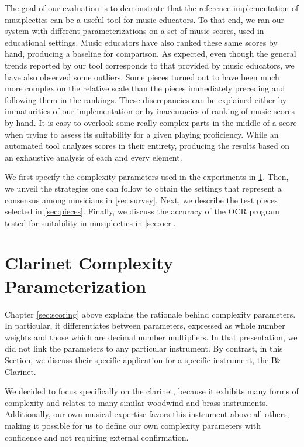 \documentclass[12pt]{report}
\begin{document}
The goal of our evaluation is to demonstrate that the reference implementation of musiplectics can be a useful tool for music educators. To that end, we ran our system with different parameterizations on a set of music scores, used in educational settings. Music educators have also ranked these same scores by hand, producing a baseline for comparison. As expected, even though the general trends reported by our tool corresponds to that provided by music educators, we have also observed some outliers. Some pieces turned out to have been much more complex on the relative scale than the pieces immediately preceding and following them in the rankings. These discrepancies can be explained either by immaturities of our implementation or by inaccuracies of ranking of music scores by hand. It is easy to overlook some really complex parts in the middle of a score when trying to assess its suitability for a given playing proficiency. While an automated tool analyzes scores in their entirety, producing the results based on an exhaustive analysis of each and every element.

We first specify the complexity parameters used in the experiments in \ref{sec:settings}. Then, we unveil the strategies one can follow to obtain the settings that represent a consensus among musicians in \ref{sec:survey}. Next, we describe the test pieces selected in \ref{sec:pieces}. Finally, we discuss the accuracy of the OCR program tested for suitability in musiplectics in \ref{sec:ocr}.


\section{Clarinet Complexity Parameterization} 
\label{sec:settings}

Chapter \ref{sec:scoring} above explains the rationale behind complexity parameters. In particular, it differentiates between parameters, expressed as whole number weights and those which are decimal number multipliers. In that presentation, we did not link the parameters to any particular instrument. By contrast, in this Section, we discuss their specific application for a specific instrument, the B$\flat$ Clarinet.

We decided to focus specifically on the clarinet, because it exhibits many forms of complexity and relates to many similar woodwind and brass instruments. Additionally, our own musical expertise favors this instrument above all others, making it possible for us to define our own complexity parameters with confidence and not requiring external confirmation.
\end{document}

